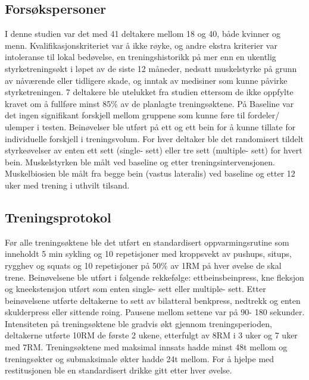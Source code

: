 \documentclass[
]{book}
\begin{document}
\hypertarget{forsuxf8kspersoner}{%
\subsection{Forsøkspersoner}\label{forsuxf8kspersoner}}

I denne studien var det med 41 deltakere mellom 18 og 40, både kvinner og menn. Kvalifikasjonskriteriet var å ikke røyke, og andre ekstra kriterier var intoleranse til lokal bedøvelse, en treningshistorikk på mer enn en ukentlig styrketreningsøkt i løpet av de siste 12 måneder, nedsatt muskelstyrke på grunn av nåværende eller tidligere skade, og inntak av medisiner som kunne påvirke styrketreningen. 7 deltakere ble utelukket fra studien ettersom de ikke oppfylte kravet om å fullføre minst 85\% av de planlagte treningsøktene. På Baseline var det ingen signifikant forskjell mellom gruppene som kunne føre til fordeler/ ulemper i testen. Beinøvelser ble utført på ett og ett bein for å kunne tillate for individuelle forskjell i treningsvolum. For hver deltaker ble det randomisert tildelt styrkeøvelser av enten ett sett (single- sett) eller tre sett (multiple- sett) for hvert bein. Muskelstyrken ble målt ved baseline og etter treningsintervensjonen. Muskelbiosien ble målt fra begge bein (vastus lateralis) ved baseline og etter 12 uker med trening i uthvilt tilsand.

\hypertarget{treningsprotokol}{%
\subsection{Treningsprotokol}\label{treningsprotokol}}

Før alle treningsøktene ble det utført en standardisert oppvarmingsrutine som inneholdt 5 min sykling og 10 repetisjoner med kroppsvekt av pushups, situps, rygghev og squats og 10 repetisjoner på 50\% av 1RM på hver øvelse de skal trene. Beinøvelsene ble utført i følgende rekkefølge: ettbeinsbeinpress, kne fleksjon og kneekstensjon utført som enten single- sett eller multiple- sett. Etter beinøvelsene utførte deltakerne to sett av bilatteral benkpress, nedtrekk og enten skulderpress eller sittende roing. Pausene mellom settene var på 90- 180 sekunder. Intensiteten på treningsøktene ble gradvis økt gjennom treningsperioden, deltakerne utførte 10RM de første 2 ukene, etterfulgt av 8RM i 3 uker og 7 uker med 7RM. Treningsøktene med maksimal innsats hadde minst 48t mellom og treningsøkter og submaksimale økter hadde 24t mellom. For å hjelpe med restitusjonen ble en standardisert drikke gitt etter hver øvelse.
\end{document}
